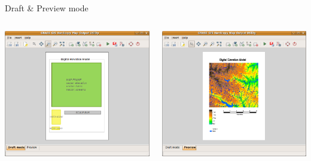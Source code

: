 \documentclass[xcolor=dvipsnames,beamer,compress]{beamer} %
\begin{document}
\begin{frame}{Draft \& Preview mode}
\begin{columns}[c]
\includegraphics[width=\textwidth]{./screenshoty/draft.png}

\includegraphics[width=\textwidth]{./screenshoty/vysledek.png}
\end{columns}

\end{frame}
\end{document}
